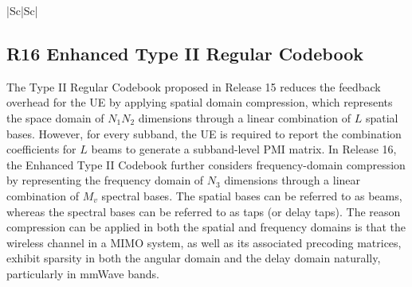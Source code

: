 \documentclass[lettersize,journal]{IEEEtran}
\begin{document}
\begin{table}[t]
\begin{tabular}{|Sc|Sc|}
\hline
{}\\ 
\hline
\end{tabular}  
\end{table} 





\subsection{R16 Enhanced Type II Regular Codebook}\label{enhanceregularII}
The Type II Regular Codebook proposed in Release 15 reduces the feedback overhead for the UE by applying spatial domain compression, which represents the space domain of $N_1N_2$ dimensions through a linear combination of $L$ spatial bases. However, for every subband, the UE is required to report the combination coefficients for $L$ beams to generate a subband-level PMI matrix. In Release 16, the Enhanced Type II Codebook further considers frequency-domain compression by representing the frequency domain of $N_3$ dimensions through a linear combination of $M_v$ spectral bases. The spatial bases can be referred to as beams, whereas the spectral bases can be referred to as taps (or delay taps). The reason compression can be applied in both the spatial and frequency domains is that the wireless channel in a MIMO system, as well as its associated precoding matrices, exhibit sparsity in both the angular domain and the delay domain naturally, particularly in mmWave bands.
\end{document}
